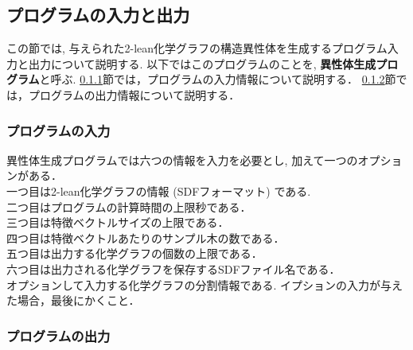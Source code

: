 \documentclass[11pt,titlepage,dvipdfmx,twoside]{jarticle}
\begin{document}
\subsection{プログラムの入力と出力}
\label{sec:InOut_m}

この節では, 与えられた2-lean化学グラフの構造異性体を生成するプログラム入力と出力について説明する.
以下ではこのプログラムのことを, {\bf 異性体生成プログラム}と呼ぶ.
\ref{sec:Input_m}節では，プログラムの入力情報について説明する．
\ref{sec:Output_m}節では，プログラムの出力情報について説明する．

\subsubsection{プログラムの入力}
\label{sec:Input_m}



異性体生成プログラムでは六つの情報を入力を必要とし, 加えて一つのオプションがある．\\
一つ目は2-lean化学グラフの情報 (SDFフォーマット) である.\\
二つ目はプログラムの計算時間の上限秒である．\\
三つ目は特徴ベクトルサイズの上限である．\\
四つ目は特徴ベクトルあたりのサンプル木の数である．\\
五つ目は出力する化学グラフの個数の上限である．\\
六つ目は出力される化学グラフを保存するSDFファイル名である．\\
オプションして入力する化学グラフの分割情報である.
イプションの入力が与えた場合，最後にかくこと．

\bigskip





\subsubsection{プログラムの出力}
\label{sec:Output_m}
\end{document}
